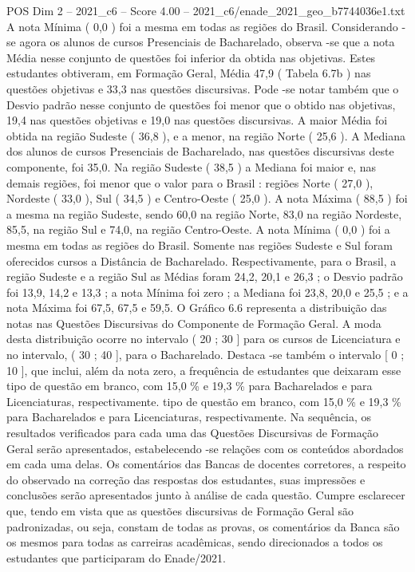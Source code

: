 \begin{textsample}{POS Dim 2 – 2021\_c6 – Score 4.00 – 2021\_c6/enade\_2021\_geo\_b7744036e1.txt}
A nota Mínima ( 0,0 ) foi a mesma em todas as regiões do Brasil.
Considerando -se agora os alunos de cursos Presenciais de Bacharelado, observa -se que a nota Média nesse conjunto de questões foi inferior da obtida nas objetivas.
Estes estudantes obtiveram, em Formação Geral, Média 47,9 ( Tabela 6.7b ) nas questões objetivas e 33,3 nas questões discursivas.
Pode -se notar também que o Desvio padrão nesse conjunto de questões foi menor que o obtido nas objetivas, 19,4 nas questões objetivas e 19,0 nas questões discursivas.
A maior Média foi obtida na região Sudeste ( 36,8 ), e a menor, na região Norte ( 25,6 ).
A Mediana dos alunos de cursos Presenciais de Bacharelado, nas questões discursivas deste componente, foi 35,0.
Na região Sudeste ( 38,5 ) a Mediana foi maior e, nas demais regiões, foi menor que o valor para o Brasil : regiões Norte ( 27,0 ), Nordeste ( 33,0 ), Sul ( 34,5 ) e Centro-Oeste ( 25,0 ).
A nota Máxima ( 88,5 ) foi a mesma na região Sudeste, sendo 60,0 na região Norte, 83,0 na região Nordeste, 85,5, na região Sul e 74,0, na região Centro-Oeste.
A nota Mínima ( 0,0 ) foi a mesma em todas as regiões do Brasil.
Somente nas regiões Sudeste e Sul foram oferecidos cursos a Distância de Bacharelado.
Respectivamente, para o Brasil, a região Sudeste e a região Sul as Médias foram 24,2, 20,1 e 26,3 ; o Desvio padrão foi 13,9, 14,2 e 13,3 ; a nota Mínima foi zero ; a Mediana foi 23,8, 20,0 e 25,5 ; e a nota Máxima foi 67,5, 67,5 e 59,5.
O Gráfico 6.6 representa a distribuição das notas nas Questões Discursivas do Componente de Formação Geral.
A moda desta distribuição ocorre no intervalo ( 20 ; 30 ] para os cursos de Licenciatura e no intervalo, ( 30 ; 40 ], para o Bacharelado.
Destaca -se também o intervalo [ 0 ; 10 ], que inclui, além da nota zero, a frequência de estudantes que deixaram esse tipo de questão em branco, com 15,0 \% e 19,3 \% para Bacharelados e para Licenciaturas, respectivamente. tipo de questão em branco, com 15,0 \% e 19,3 \% para Bacharelados e para Licenciaturas, respectivamente.
Na sequência, os resultados verificados para cada uma das Questões Discursivas de Formação Geral serão apresentados, estabelecendo -se relações com os conteúdos abordados em cada uma delas.
Os comentários das Bancas de docentes corretores, a respeito do observado na correção das respostas dos estudantes, suas impressões e conclusões serão apresentados junto à análise de cada questão.
Cumpre esclarecer que, tendo em vista que as questões discursivas de Formação Geral são padronizadas, ou seja, constam de todas as provas, os comentários da Banca são os mesmos para todas as carreiras acadêmicas, sendo direcionados a todos os estudantes que participaram do Enade/2021.

\end{textsample}

